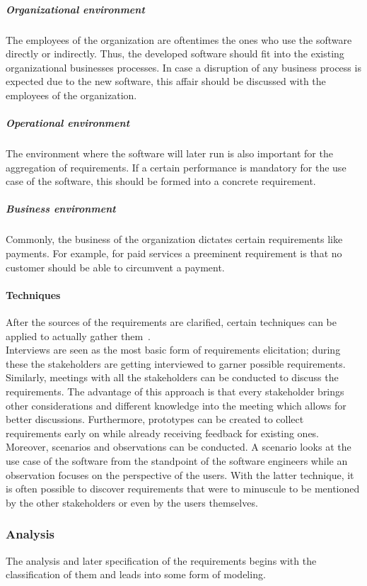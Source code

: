 \documentclass[12pt,a4paper,twoside]{report}
\begin{document}
\subparagraph{Organizational environment}
The employees of the organization are oftentimes the ones who use the software
directly or indirectly. Thus, the developed software should fit into the existing
organizational businesses processes. In case a disruption of any business process
is expected due to the new software, this affair should be discussed with the
employees of the organization.

\subparagraph{Operational environment}
The environment where the software will later run is also important for the
aggregation of requirements. If a certain performance is mandatory for the use case
of the software, this should be formed into a concrete requirement.

\subparagraph{Business environment}
Commonly, the business of the organization dictates certain requirements like
payments. For example, for paid services a preeminent requirement is that
no customer should be able to circumvent a payment.


\paragraph{Techniques}
After the sources of the requirements are clarified, certain techniques can be
applied to actually gather them~\cite{sommerville-se, swebok}.\\
Interviews are seen as the most basic form of requirements elicitation;
during these the stakeholders are getting interviewed to garner possible requirements.
Similarly, meetings with all the stakeholders can be conducted to discuss the requirements.
The advantage of this approach is that every stakeholder brings other considerations and
different knowledge into the meeting which allows for better discussions.
Furthermore, prototypes can be created to collect requirements early on while already
receiving feedback for existing ones. Moreover, scenarios and observations can be
conducted. A scenario looks at the use case of the software from the standpoint
of the software engineers while an observation focuses on the perspective of the
users. With the latter technique, it is often possible to discover requirements
that were to minuscule to be mentioned by the other stakeholders or even by the users themselves.


\subsubsection{Analysis}

The analysis and later specification of the requirements begins with the classification
of them and leads into some form of modeling.
\end{document}
